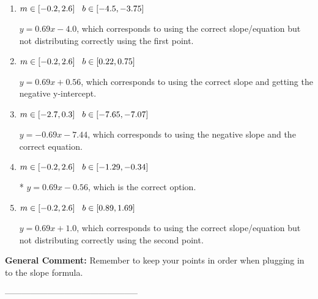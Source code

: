 \documentclass{extbook}[14pt]
\begin{document}
\begin{enumerate}[label=\Alph*.] 
\item $ m \in [-0.2, 2.6] \hspace*{3mm} b \in [-4.5, -3.75] $ 

  $y = 0.69x -4.0$, which corresponds to using the correct slope/equation but not distributing correctly using the first point. 
\item $ m \in [-0.2, 2.6] \hspace*{3mm} b \in [0.22, 0.75] $ 

  $y = 0.69x + 0.56$, which corresponds to using the correct slope and getting the negative y-intercept. 
\item $ m \in [-2.7, 0.3] \hspace*{3mm} b \in [-7.65, -7.07] $ 

  $y = -0.69x -7.44$, which corresponds to using the negative slope and the correct equation. 
\item $ m \in [-0.2, 2.6] \hspace*{3mm} b \in [-1.29, -0.34] $ 

 * $y = 0.69x -0.56$, which is the correct option. 
\item $ m \in [-0.2, 2.6] \hspace*{3mm} b \in [0.89, 1.69] $ 

  $y = 0.69x + 1.0$, which corresponds to using the correct slope/equation but not distributing correctly using the second point. 
\end{enumerate} 
 
\textbf{General Comment:} Remember to keep your points in order when plugging in to the slope formula. 

-----------------------------------------------
\end{document}
